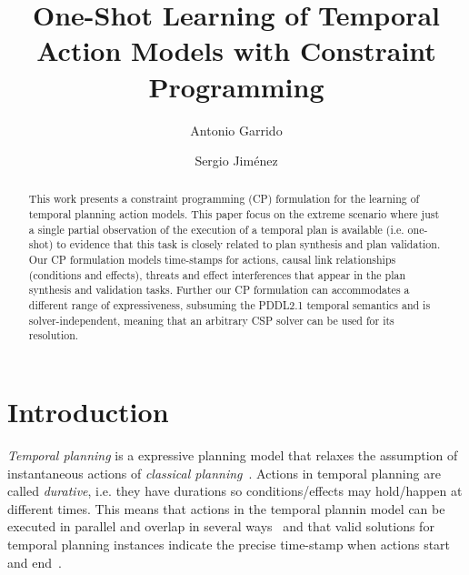 \documentclass{ecai}
\begin{document}
\title{One-Shot Learning of Temporal Action Models with Constraint Programming}
\author{Antonio Garrido \and Sergio Jim\'enez}
 
\maketitle

\begin{abstract}
  This work presents a constraint programming (CP) formulation for the learning of temporal planning action models. This paper focus on the extreme scenario where just a single partial observation of the execution of a temporal plan is available (i.e. one-shot) to evidence that this task is closely related to plan synthesis and plan validation. Our CP formulation models time-stamps for actions, causal link relationships (conditions and effects), threats and effect interferences that appear in the plan synthesis and validation tasks. Further our CP formulation can accommodates a different range of expressiveness, subsuming the PDDL2.1 temporal semantics and is solver-independent, meaning that an arbitrary CSP solver can be used for its resolution. 
\end{abstract}


\section{Introduction}
{\em Temporal planning} is a expressive planning model that relaxes the assumption of instantaneous actions of {\em classical planning}~\cite{fox2003pddl2}. Actions in temporal planning are called {\em durative}, i.e. they have durations so conditions/effects may hold/happen at different times. This means that actions in the temporal plannin model can be executed in parallel and overlap in several ways~\cite{cushing2007temporal} and that valid solutions for temporal planning instances indicate the precise time-stamp when actions start and end~\cite{howey2004val}.
\end{document}

